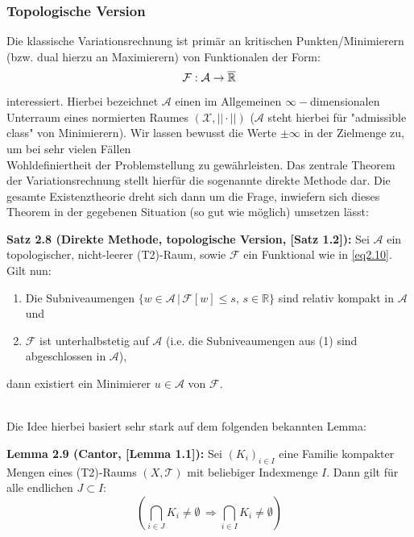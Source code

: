 \subsubsection{Topologische Version}
Die klassische Variationsrechnung ist primär an kritischen Punkten/Minimierern (bzw. dual hierzu an Maximierern) von Funktionalen der Form:
\begin{equation}{\label{eq2.10}}
    \mathcal{F}: \mathcal{A} \to \overline{\mathbb{R}}
\end{equation}
interessiert. Hierbei bezeichnet \(\mathcal{A}\) einen im Allgemeinen \(\infty-\)dimensionalen Unterraum eines normierten Raumes \((\mathcal{X},||\cdot||)\) (\(\mathcal{A}\) steht hierbei für "admissible class" von Minimierern).
Wir lassen bewusst die Werte \(\pm \infty\) in der Zielmenge zu, um bei sehr vielen Fällen\\ Wohldefiniertheit der Problemstellung zu gewährleisten. Das zentrale Theorem der Variationsrechnung stellt hierfür die sogenannte direkte Methode dar. Die gesamte Existenztheorie dreht sich dann um die Frage, inwiefern sich dieses Theorem in der gegebenen Situation (so gut wie möglich) umsetzen lässt:\\[0.5cm]
\colorbox{generalYellow}{\begin{minipage}{16cm}{\textcolor{black}{}{\label{theo2.8}}}
\textbf{Satz 2.8 (Direkte Methode, topologische Version, \cite{RelaxPaper}[Satz 1.2]):} Sei \(\mathcal{A}\) ein topologischer, nicht-leerer (T2)-Raum, sowie \(\mathcal{F}\) ein Funktional wie in \eqref{eq2.10}. Gilt nun:
\begin{enumerate}
    \item Die Subniveaumengen \(\{w \in \mathcal{A}\, | \, \mathcal{F}[w] \le s,\, s \in \mathbb{R}\}\) sind relativ kompakt in \(\mathcal{A}\) und
    \item \(\mathcal{F}\) ist unterhalbstetig auf \(\mathcal{A}\) (i.e. die Subniveaumengen aus (1) sind abgeschlossen in \(\mathcal{A}\)),
\end{enumerate}
dann existiert ein Minimierer \(u \in \mathcal{A}\) von \(\mathcal{F}\).
\end{minipage}}\\

Die Idee hierbei basiert sehr stark auf dem folgenden bekannten Lemma:\\[0.5cm]
\colorbox{generalYellow}{\begin{minipage}{16cm}{\textcolor{black}{}{\label{lem2.9}}}
\textbf{Lemma 2.9 (Cantor, \cite{RelaxPaper}[Lemma 1.1]):} Sei \((K_i)_{i \in I}\) eine Familie kompakter Mengen eines (T2)-Raums \((X,\mathcal{T})\) mit beliebiger Indexmenge \(I\). Dann gilt für alle endlichen \(J \subset I\):
\begin{equation}
    (\bigcap_{i \in J} K_i \neq \emptyset \, \Rightarrow \bigcap_{i \in I} K_i \neq \emptyset)
\end{equation}
\end{minipage}}

